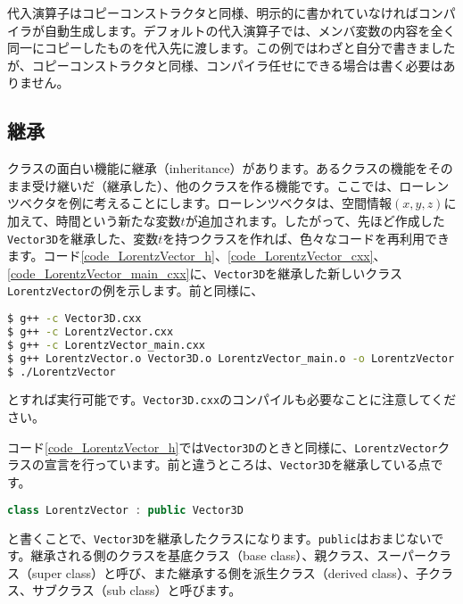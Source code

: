 代入演算子はコピーコンストラクタと同様、明示的に書かれていなければコンパイラが自動生成します。デフォルトの代入演算子では、メンバ変数の内容を全く同一にコピーしたものを代入先に渡します。この例ではわざと自分で書きましたが、コピーコンストラクタと同様、コンパイラ任せにできる場合は書く必要はありません。

\subsection{継承}

クラスの面白い機能に継承（inheritance）があります。あるクラスの機能をそのまま受け継いだ（継承した）、他のクラスを作る機能です。ここでは、ローレンツベクタを例に考えることにします。ローレンツベクタは、空間情報$(x, y, z)$に加えて、時間という新たな変数$t$が追加されます。したがって、先ほど作成した\texttt{Vector3D}を継承した、変数$t$を持つクラスを作れば、色々なコードを再利用できます。コード\ref{code_LorentzVector_h}、\ref{code_LorentzVector_cxx}、\ref{code_LorentzVector_main_cxx}に、\texttt{Vector3D}を継承した新しいクラス\texttt{LorentzVector}の例を示します。前と同様に、
\begin{lstlisting}[language=bash]
$ g++ -c Vector3D.cxx
$ g++ -c LorentzVector.cxx
$ g++ -c LorentzVector_main.cxx
$ g++ LorentzVector.o Vector3D.o LorentzVector_main.o -o LorentzVector
$ ./LorentzVector
\end{lstlisting}
とすれば実行可能です。\texttt{Vector3D.cxx}のコンパイルも必要なことに注意してください。

\begin{NoFloat}

\end{NoFloat}
\begin{NoFloat}

\end{NoFloat}
\begin{NoFloat}

\end{NoFloat}

コード\ref{code_LorentzVector_h}では\texttt{Vector3D}のときと同様に、\texttt{LorentzVector}クラスの宣言を行っています。前と違うところは、\texttt{Vector3D}を継承している点です。
\begin{lstlisting}[language=c++]
class LorentzVector : public Vector3D
\end{lstlisting}
と書くことで、\texttt{Vector3D}を継承したクラスになります。\texttt{public}はおまじないです。継承される側のクラスを基底クラス（base class）、親クラス、スーパークラス（super class）と呼び、また継承する側を派生クラス（derived class）、子クラス、サブクラス（sub class）と呼びます。

